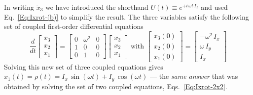 In writing $\dot{x}_3$ we have introduced the shorthand $U(t) \equiv e^{+i \, \omega t \, I_z}$ and used Eq.~\ref{Eq:Ixrot-(b)} to simplify the result.  The three variables satisfy the following set of coupled first-order differential equations
\begin{equation}
\frac{d}{dt} \begin{bmatrix} x_3 \\ x_2 \\ x_1 \end{bmatrix}
	= \begin{bmatrix} 
	    0 & \omega^2 & 0 \\
		1 & 0 & 0 \\
		0 & 1 & 0
	  \end{bmatrix}
	  \begin{bmatrix} 
	  	x_3 \\ x_2 \\ x_1
	   \end{bmatrix}
\text{ with } 
\begin{bmatrix}
    x_3(0) \\
    x_2(0) \\ 
    x_1(0) 
 \end{bmatrix}
=
\begin{bmatrix}
	- \omega^2 \, I_{x} \\ 
	\omega \, I_{y} \\
	I_{x}
\end{bmatrix}
\end{equation}
Solving this new set of three coupled equations gives $x_1(t) = \rho(t) = I_x \, \sin{(\omega t)} + I_y \, \cos{(\omega t)}$ --- the \emph{same answer} that was obtained by solving the set of two coupled equations, Eqs.~\ref{Eq:Ixrot-2x2}.



